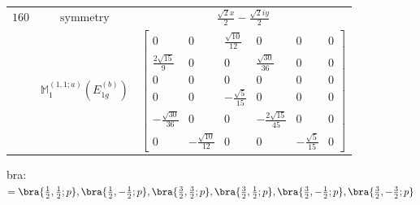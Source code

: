\documentclass[fleqn,8pt,landscape]{jsarticle}
\begin{document}
\begin{longtable}{ccc}
$ 160 $ & $ \text{symmetry} $ & $ \frac{\sqrt{2} x}{2} - \frac{\sqrt{2} i y}{2} $ \\
$  $ & $ \mathbb{M}_{1}^{(1,1;a)}(E_{1g}^{(b)}) $ & $ \begin{bmatrix} 0 & 0 & \frac{\sqrt{10}}{12} & 0 & 0 & 0 \\ \frac{2 \sqrt{15}}{9} & 0 & 0 & \frac{\sqrt{30}}{36} & 0 & 0 \\ 0 & 0 & 0 & 0 & 0 & 0 \\ 0 & 0 & - \frac{\sqrt{5}}{15} & 0 & 0 & 0 \\ - \frac{\sqrt{30}}{36} & 0 & 0 & - \frac{2 \sqrt{15}}{45} & 0 & 0 \\ 0 & - \frac{\sqrt{10}}{12} & 0 & 0 & - \frac{\sqrt{5}}{15} & 0 \end{bmatrix} $ \\ \hline
\end{longtable}
bra: $=\bra{\frac{1}{2},\frac{1}{2};p}, \bra{\frac{1}{2},- \frac{1}{2};p}, \bra{\frac{3}{2},\frac{3}{2};p}, \bra{\frac{3}{2},\frac{1}{2};p}, \bra{\frac{3}{2},- \frac{1}{2};p}, \bra{\frac{3}{2},- \frac{3}{2};p}$
\end{document}
